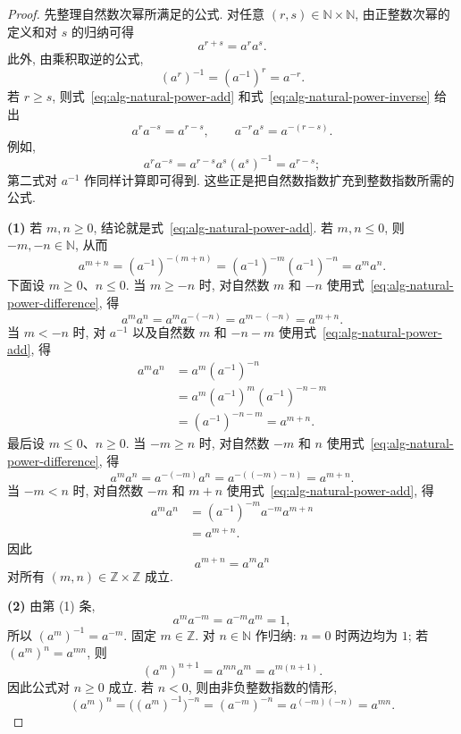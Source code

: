 \documentclass[usesamecnt, thmcnt=section, lang=cn, newtx, 10pt, scheme=chinese]{elegantbook}
\begin{document}
\begin{proof}
先整理自然数次幂所满足的公式. 对任意 $(r,s)\in\mathbb N\times\mathbb N$, 由正整数次幂的定义和对 $s$ 的归纳可得
\begin{equation}\label{eq:alg-natural-power-add}
 a^{r+s}=a^ra^s.
\end{equation}
此外, 由乘积取逆的公式,
\begin{equation}\label{eq:alg-natural-power-inverse}
 (a^r)^{-1}=(a^{-1})^r=a^{-r}.
\end{equation}
若 $r\geq s$, 则式~\eqref{eq:alg-natural-power-add} 和式~\eqref{eq:alg-natural-power-inverse} 给出
\begin{equation}\label{eq:alg-natural-power-difference}
 a^ra^{-s}=a^{r-s},
 \qquad
 a^{-r}a^s=a^{-(r-s)}.
\end{equation}
例如,
\[
 a^ra^{-s}=a^{r-s}a^s(a^s)^{-1}=a^{r-s};
\]
第二式对 $a^{-1}$ 作同样计算即可得到. 这些正是把自然数指数扩充到整数指数所需的公式.

\smallskip
\noindent
\textbf{(1)} 若 $m,n\geq0$, 结论就是式~\eqref{eq:alg-natural-power-add}. 若 $m,n\leq0$, 则 $-m,-n\in\mathbb N$, 从而
\[
 a^{m+n}
 =(a^{-1})^{-(m+n)}
 =(a^{-1})^{-m}(a^{-1})^{-n}
 =a^ma^n.
\]
下面设 $m\geq0$、$n\leq0$. 当 $m\geq -n$ 时, 对自然数 $m$ 和 $-n$ 使用式~\eqref{eq:alg-natural-power-difference}, 得
\[
 a^ma^n=a^ma^{-(-n)}=a^{m-(-n)}=a^{m+n}.
\]
当 $m<-n$ 时, 对 $a^{-1}$ 以及自然数 $m$ 和 $-n-m$ 使用式~\eqref{eq:alg-natural-power-add}, 得
\[
 \begin{aligned}
 a^ma^n
 &=a^m(a^{-1})^{-n}\\
 &=a^m(a^{-1})^m(a^{-1})^{-n-m}\\
 &=(a^{-1})^{-n-m}
 =a^{m+n}.
 \end{aligned}
\]
最后设 $m\leq0$、$n\geq0$. 当 $-m\geq n$ 时, 对自然数 $-m$ 和 $n$ 使用式~\eqref{eq:alg-natural-power-difference}, 得
\[
 a^ma^n=a^{-(-m)}a^n=a^{-((-m)-n)}=a^{m+n}.
\]
当 $-m<n$ 时, 对自然数 $-m$ 和 $m+n$ 使用式~\eqref{eq:alg-natural-power-add}, 得
\[
 \begin{aligned}
 a^ma^n
 &=(a^{-1})^{-m}a^{-m}a^{m+n}\\
 &=a^{m+n}.
 \end{aligned}
\]
因此
\[
 a^{m+n}=a^ma^n
\]
对所有 $(m,n)\in\mathbb Z\times\mathbb Z$ 成立.

\smallskip
\noindent
\textbf{(2)} 由第 (1) 条,
\[
 a^ma^{-m}=a^{-m}a^m=1,
\]
所以 $(a^m)^{-1}=a^{-m}$. 固定 $m\in\mathbb Z$. 对 $n\in\mathbb N$ 作归纳: $n=0$ 时两边均为 $1$; 若 $(a^m)^n=a^{mn}$, 则
\[
 (a^m)^{n+1}=a^{mn}a^m=a^{m(n+1)}.
\]
因此公式对 $n\geq0$ 成立. 若 $n<0$, 则由非负整数指数的情形,
\[
 (a^m)^n
 =\bigl((a^m)^{-1}\bigr)^{-n}
 =(a^{-m})^{-n}
 =a^{(-m)(-n)}
 =a^{mn}.
\]


\end{proof}
\end{document}
